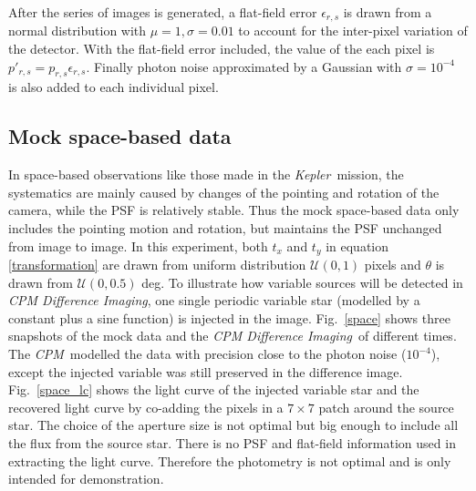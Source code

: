 \documentclass[12pt, preprint]{aastex}
\newcommand{\project}[1]{\textsl{#1}}
\newcommand{\cpm}{\project{CPM}}
\newcommand{\cpmdiff}{\project{CPM Difference Imaging}}
\newcommand{\kepler}{\project{Kepler}}
\begin{document}
After the series of images is generated, a flat-field error $\epsilon_{r,s}$ is drawn from a normal distribution with $\mu=1, \sigma=0.01$ to account for the inter-pixel variation of the detector.
With the flat-field error included, the value of the each pixel is $p'_{r,s} = p_{r,s}\epsilon_{r,s}$.
Finally photon noise approximated by a Gaussian with $\sigma = 10^{-4}$ is also added to each individual pixel.

\subsection{Mock space-based data}
In space-based observations like those made in the \kepler\ mission, the systematics are mainly caused by changes of the pointing and rotation of the camera, while the PSF is relatively stable. 
Thus the mock space-based data only includes the pointing motion and rotation, but maintains the PSF unchanged from image to image.
In this experiment,  both $t_x $ and $t_y$ in equation \ref{transformation} are drawn from uniform distribution ${\mathcal {U}}(0,1)$ pixels and $\theta$ is drawn from ${\mathcal {U}}(0,0.5)$ deg. 
To illustrate how variable sources will be detected in \cpmdiff, one single periodic variable star (modelled by a constant plus a sine function) is injected in the image.
Fig.~\ref{space} shows three snapshots of the mock data and the \cpmdiff\ of different times. 
The \cpm\ modelled the data with precision close to the photon noise ($10^{-4}$), except the injected variable was still preserved in the difference image. 
Fig.~\ref{space_lc} shows the light curve of the injected variable star and the recovered light curve by co-adding the pixels in a $7\times 7$ patch around the source star.
The choice of the aperture size is not optimal but big enough to include all the flux from the source star. 
There is no PSF and flat-field information used in extracting the light curve. 
Therefore the photometry is not optimal and is only intended for demonstration.
\end{document}
